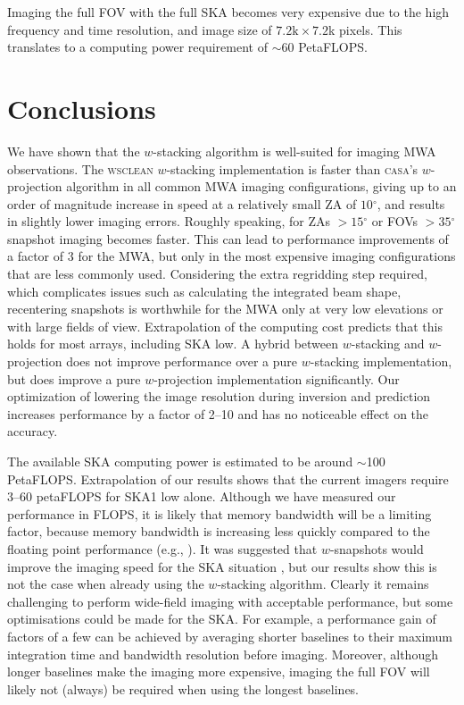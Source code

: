 \documentclass[useAMS,usenatbib]{mn2e}
\newcommand{\degree}{\ensuremath{^{\circ}}\xspace}
\begin{document}
Imaging the full FOV with the full SKA becomes very expensive due to the high frequency and time resolution, and image size of $7.2\textrm{k} \times 7.2$k pixels. This translates to a computing power requirement of $\sim60$ PetaFLOPS.

\section{Conclusions} \label{sec:conclusions}
We have shown that the $w$-stacking algorithm is well-suited for imaging MWA observations. The \textsc{wsclean} $w$-stacking implementation is faster than \textsc{casa}'s $w$-projection algorithm in all common MWA imaging configurations, giving up to an order of magnitude increase in speed at a relatively small ZA of $10$\degree, and results in slightly lower imaging errors. Roughly speaking, for ZAs $>15\degree$ or FOVs $>35\degree$ snapshot imaging becomes faster. This can lead to performance improvements of a factor of $3$ for the MWA, but only in the most expensive imaging configurations that are less commonly used. Considering the extra regridding step required, which complicates issues such as calculating the integrated beam shape, recentering snapshots is worthwhile for the MWA only at very low elevations or with large fields of view. Extrapolation of the computing cost predicts that this holds for most arrays, including SKA low. A hybrid between $w$-stacking and $w$-projection does not improve performance over a pure $w$-stacking implementation, but does improve a pure $w$-projection implementation significantly. Our optimization of lowering the image resolution during inversion and prediction increases performance by a factor of 2--10 and has no noticeable effect on the accuracy.

The available SKA computing power is estimated to be around $\sim$100 PetaFLOPS. Extrapolation of our results shows that the current imagers require $3$--$60$ petaFLOPS for SKA1 low alone. Although we have measured our performance in FLOPS, it is likely that memory bandwidth will be a limiting factor, because memory bandwidth is increasing less quickly compared to the floating point performance (e.g., \citealt{gpu-gridding-romein-2012}). It was suggested that $w$-snapshots would improve the imaging speed for the SKA situation \citep{widefield-imaging-ska-cornwell}, but our results show this is not the case when already using the $w$-stacking algorithm. Clearly it remains challenging to perform wide-field imaging with acceptable performance, but some optimisations could be made for the SKA. For example, a performance gain of factors of a few can be achieved by averaging shorter baselines to their maximum integration time and bandwidth resolution before imaging. Moreover, although longer baselines make the imaging more expensive, imaging the full FOV will likely not (always) be required when using the longest baselines.
\end{document}
